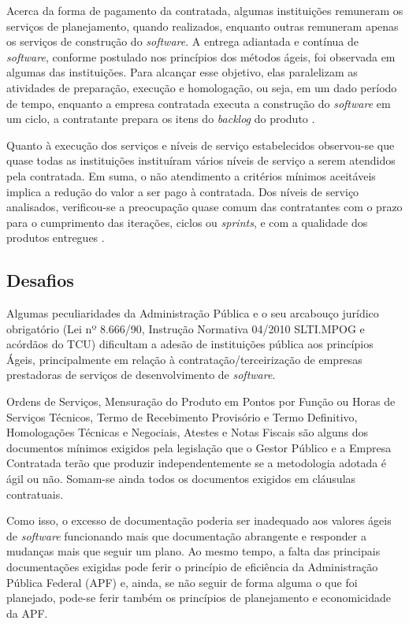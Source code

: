 Acerca da forma de pagamento da contratada, algumas instituições remuneram os serviços de planejamento, quando realizados, enquanto outras remuneram apenas os serviços de construção do \textit{software}. A entrega adiantada e contínua de \textit{software}, conforme postulado nos princípios dos métodos ágeis, foi observada em algumas das instituições. Para alcançar esse objetivo, elas paralelizam as atividades de preparação, execução e homologação, ou seja, em um dado período de tempo, enquanto a empresa contratada executa a construção do \textit{software} em um ciclo, a contratante prepara os itens do \textit{backlog} do produto \cite{TCU:2013}. 

Quanto à execução dos serviços e níveis de serviço estabelecidos observou-se que quase todas as instituições instituíram vários níveis de serviço a serem atendidos pela contratada. Em suma, o não atendimento a critérios mínimos aceitáveis implica a redução do valor a ser pago à contratada. Dos níveis de serviço analisados, verificou-se a preocupação quase comum das contratantes com o prazo para o cumprimento das iterações, ciclos ou \textit{sprints}, e com a qualidade dos produtos entregues  \cite{TCU:2013}.

\subsection[Desafios]{Desafios}

Algumas peculiaridades da Administração Pública e o seu arcabouço jurídico obrigatório (Lei nº 8.666/90, Instrução Normativa 04/2010 SLTI.MPOG e acórdãos do TCU) dificultam a adesão de instituições pública aos princípios Ágeis, principalmente em relação à contratação/terceirização de empresas prestadoras de serviços de desenvolvimento de \textit{software}.

Ordens de Serviços, Mensuração do Produto em Pontos por Função ou Horas de Serviços Técnicos, Termo de Recebimento Provisório e Termo Definitivo, Homologações Técnicas e Negociais, Atestes e Notas Fiscais são alguns dos documentos mínimos exigidos pela legislação que o Gestor Público e a Empresa Contratada terão que produzir independentemente se a metodologia adotada é ágil ou não. Somam-se ainda todos os documentos exigidos em cláusulas contratuais. 

Como isso, o excesso de documentação poderia ser inadequado aos valores ágeis de \textit{software} funcionando mais que documentação abrangente e responder a mudanças mais que seguir um plano. Ao mesmo tempo, a falta das principais documentações exigidas pode ferir o princípio de eficiência da Administração Pública Federal (APF) e, ainda, se não seguir de forma alguma o que foi  planejado, pode-se ferir também os princípios de planejamento e economicidade da APF. \cite{ruas}

